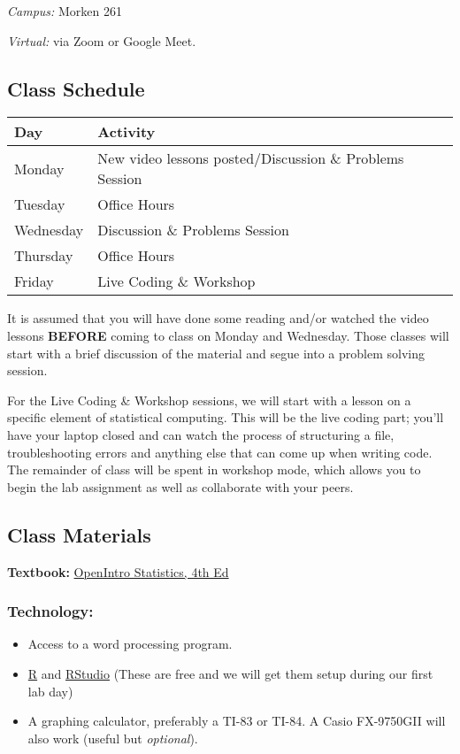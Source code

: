 \documentclass[
]{book}
\providecommand{\tightlist}{%
  \setlength{\itemsep}{0pt}\setlength{\parskip}{0pt}}
\begin{document}
\emph{Campus:} Morken 261

\emph{Virtual:} via Zoom or Google Meet.

\hypertarget{class-schedule}{%
\subsection{Class Schedule}\label{class-schedule}}

\begin{tabular}{l|l}
\hline
Day & Activity\\
\hline
Monday & New video lessons posted/Discussion \& Problems Session\\
\hline
Tuesday & Office Hours\\
\hline
Wednesday & Discussion \& Problems Session\\
\hline
Thursday & Office Hours\\
\hline
Friday & Live Coding \& Workshop\\
\hline
\end{tabular}

It is assumed that you will have done some reading and/or watched the video lessons \textbf{BEFORE} coming to class on Monday and Wednesday. Those classes will start with a brief discussion of the material and segue into a problem solving session.

For the Live Coding \& Workshop sessions, we will start with a lesson on a specific element of statistical computing. This will be the live coding part; you'll have your laptop closed and can watch the process of structuring a file, troubleshooting errors and anything else that can come up when writing code. The remainder of class will be spent in workshop mode, which allows you to begin the lab assignment as well as collaborate with your peers.

\hypertarget{class-materials}{%
\subsection{Class Materials}\label{class-materials}}

\textbf{Textbook:} \href{https://leanpub.com/openintro-statistics}{OpenIntro Statistics, 4th Ed}

\hypertarget{technology}{%
\subsubsection{Technology:}\label{technology}}

\begin{itemize}
\tightlist
\item
  Access to a word processing program.
\item
  \href{https://cran.r-project.org/}{R} and \href{https://rstudio.com/}{RStudio} (These are free and we will get them setup during our first lab day)
\item
  A graphing calculator, preferably a TI-83 or TI-84. A Casio FX-9750GII will also work (useful but \emph{optional}).
\end{itemize}
\end{document}
